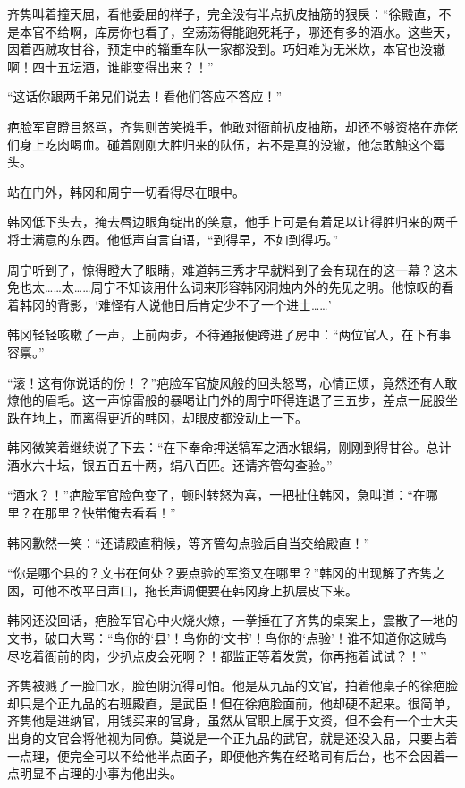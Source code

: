 齐隽叫着撞天屈，看他委屈的样子，完全没有半点扒皮抽筋的狠戾：“徐殿直，不是本官不给啊，库房你也看了，空荡荡得能跑死耗子，哪还有多的酒水。这些天，因着西贼攻甘谷，预定中的辎重车队一家都没到。巧妇难为无米炊，本官也没辙啊！四十五坛酒，谁能变得出来？！”

“这话你跟两千弟兄们说去！看他们答应不答应！”

疤脸军官瞪目怒骂，齐隽则苦笑摊手，他敢对衙前扒皮抽筋，却还不够资格在赤佬们身上吃肉喝血。碰着刚刚大胜归来的队伍，若不是真的没辙，他怎敢触这个霉头。

站在门外，韩冈和周宁一切看得尽在眼中。

韩冈低下头去，掩去唇边眼角绽出的笑意，他手上可是有着足以让得胜归来的两千将士满意的东西。他低声自言自语，“到得早，不如到得巧。”

周宁听到了，惊得瞪大了眼睛，难道韩三秀才早就料到了会有现在的这一幕？这未免也太……太……周宁不知该用什么词来形容韩冈洞烛内外的先见之明。他惊叹的看着韩冈的背影，‘难怪有人说他日后肯定少不了一个进士……’

韩冈轻轻咳嗽了一声，上前两步，不待通报便跨进了房中：“两位官人，在下有事容禀。”

“滚！这有你说话的份！？”疤脸军官旋风般的回头怒骂，心情正烦，竟然还有人敢燎他的眉毛。这一声惊雷般的暴喝让门外的周宁吓得连退了三五步，差点一屁股坐跌在地上，而离得更近的韩冈，却眼皮都没动上一下。

韩冈微笑着继续说了下去：“在下奉命押送犒军之酒水银绢，刚刚到得甘谷。总计酒水六十坛，银五百五十两，绢八百匹。还请齐管勾查验。”

“酒水？！”疤脸军官脸色变了，顿时转怒为喜，一把扯住韩冈，急叫道：“在哪里？在那里？快带俺去看看！”

韩冈歉然一笑：“还请殿直稍候，等齐管勾点验后自当交给殿直！”

“你是哪个县的？文书在何处？要点验的军资又在哪里？”韩冈的出现解了齐隽之困，可他不改平日声口，拖长声调便要在韩冈身上扒层皮下来。

韩冈还没回话，疤脸军官心中火烧火燎，一拳捶在了齐隽的桌案上，震散了一地的文书，破口大骂：“鸟你的‘县’！鸟你的‘文书’！鸟你的‘点验’！谁不知道你这贼鸟尽吃着衙前的肉，少扒点皮会死啊？！都监正等着发赏，你再拖着试试？！”

齐隽被溅了一脸口水，脸色阴沉得可怕。他是从九品的文官，拍着他桌子的徐疤脸却只是个正九品的右班殿直，是武臣！但在徐疤脸面前，他却硬不起来。很简单，齐隽他是进纳官，用钱买来的官身，虽然从官职上属于文资，但不会有一个士大夫出身的文官会将他视为同僚。莫说是一个正九品的武官，就是还没入品，只要占着一点理，便完全可以不给他半点面子，即便他齐隽在经略司有后台，也不会因着一点明显不占理的小事为他出头。

